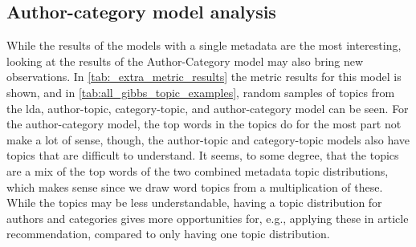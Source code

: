 \subsection{Author-category model analysis}
While the results of the models with a single metadata are the most interesting, looking at the results of the Author-Category model may also bring new observations.
In \autoref{tab:_extra_metric_results} the metric results for this model is shown, and in \autoref{tab:all_gibbs_topic_examples}, random samples of topics from the \gls{lda}, author-topic, category-topic, and author-category model can be seen.
For the author-category model, the top words in the topics do for the most part not make a lot of sense, though, the author-topic and category-topic models also have topics that are difficult to understand.
It seems, to some degree, that the topics are a mix of the top words of the two combined metadata topic distributions, which makes sense since we draw word topics from a multiplication of these.
While the topics may be less understandable, having a topic distribution for authors and categories gives more opportunities for, e.g., applying these in article recommendation, compared to only having one topic distribution.
